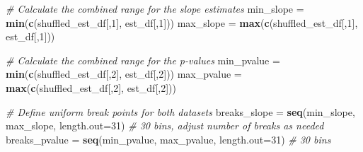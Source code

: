 \documentclass[
]{article}
\newenvironment{Shaded}{\begin{snugshade}}{\end{snugshade}}
\newcommand{\AttributeTok}[1]{\textcolor[rgb]{0.13,0.29,0.53}{#1}}
\newcommand{\CommentTok}[1]{\textcolor[rgb]{0.56,0.35,0.01}{\textit{#1}}}
\newcommand{\DecValTok}[1]{\textcolor[rgb]{0.00,0.00,0.81}{#1}}
\newcommand{\FunctionTok}[1]{\textcolor[rgb]{0.13,0.29,0.53}{\textbf{#1}}}
\newcommand{\NormalTok}[1]{#1}
\newcommand{\OtherTok}[1]{\textcolor[rgb]{0.56,0.35,0.01}{#1}}
\begin{document}
\begin{Shaded}
\begin{Highlighting}[]
\CommentTok{\# Calculate the combined range for the slope estimates}
\NormalTok{min\_slope }\OtherTok{=} \FunctionTok{min}\NormalTok{(}\FunctionTok{c}\NormalTok{(shuffled\_est\_df[,}\DecValTok{1}\NormalTok{], est\_df[,}\DecValTok{1}\NormalTok{]))}
\NormalTok{max\_slope }\OtherTok{=} \FunctionTok{max}\NormalTok{(}\FunctionTok{c}\NormalTok{(shuffled\_est\_df[,}\DecValTok{1}\NormalTok{], est\_df[,}\DecValTok{1}\NormalTok{]))}

\CommentTok{\# Calculate the combined range for the p{-}values}
\NormalTok{min\_pvalue }\OtherTok{=} \FunctionTok{min}\NormalTok{(}\FunctionTok{c}\NormalTok{(shuffled\_est\_df[,}\DecValTok{2}\NormalTok{], est\_df[,}\DecValTok{2}\NormalTok{]))}
\NormalTok{max\_pvalue }\OtherTok{=} \FunctionTok{max}\NormalTok{(}\FunctionTok{c}\NormalTok{(shuffled\_est\_df[,}\DecValTok{2}\NormalTok{], est\_df[,}\DecValTok{2}\NormalTok{]))}

\CommentTok{\# Define uniform break points for both datasets}
\NormalTok{breaks\_slope }\OtherTok{=} \FunctionTok{seq}\NormalTok{(min\_slope, max\_slope, }\AttributeTok{length.out=}\DecValTok{31}\NormalTok{)  }\CommentTok{\# 30 bins, adjust number of breaks as needed}
\NormalTok{breaks\_pvalue }\OtherTok{=} \FunctionTok{seq}\NormalTok{(min\_pvalue, max\_pvalue, }\AttributeTok{length.out=}\DecValTok{31}\NormalTok{)  }\CommentTok{\# 30 bins}


\end{Highlighting}
\end{Shaded}
\end{document}
